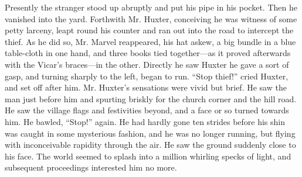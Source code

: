 Presently the stranger stood up abruptly and put his pipe in his pocket. Then he vanished into the yard. Forthwith Mr. Huxter, conceiving he was witness of some petty larceny, leapt round his counter and ran out into the road to intercept the thief. As he did so, Mr. Marvel reappeared, his hat askew, a big bundle in a blue table-cloth in one hand, and three books tied together—as it proved afterwards with the Vicar’s braces—in the other. Directly he saw Huxter he gave a sort of gasp, and turning sharply to the left, began to run. “Stop thief!” cried Huxter, and set off after him. Mr. Huxter’s sensations were vivid but brief. He saw the man just before him and spurting briskly for the church corner and the hill road. He saw the village flags and festivities beyond, and a face or so turned towards him. He bawled, “Stop!” again. He had hardly gone ten strides before his shin was caught in some mysterious fashion, and he was no longer running, but flying with inconceivable rapidity through the air. He saw the ground suddenly close to his face. The world seemed to splash into a million whirling specks of light, and subsequent proceedings interested him no more.